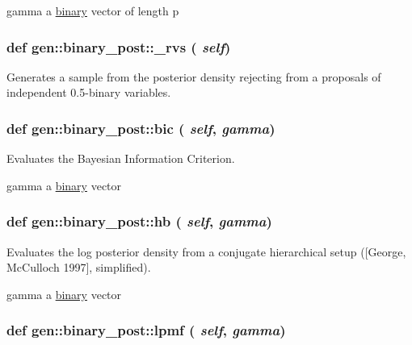 gamma a \hyperlink{classgen_1_1binary}{binary} vector of length p \hypertarget{classgen_1_1binary__post_bc265fbdb0840423716d8a4904469ac8}{
\subsubsection[{\_\-rvs}]{\setlength{\rightskip}{0pt plus 5cm}def gen::binary\_\-post::\_\-rvs ( {\em self})}}
\label{classgen_1_1binary__post_bc265fbdb0840423716d8a4904469ac8}


Generates a sample from the posterior density rejecting from a proposals of independent 0.5-binary variables. 

\hypertarget{classgen_1_1binary__post_f34f5b3a16fe5f6b90b61feac26a759c}{
\subsubsection[{bic}]{\setlength{\rightskip}{0pt plus 5cm}def gen::binary\_\-post::bic ( {\em self}, \/   {\em gamma})}}
\label{classgen_1_1binary__post_f34f5b3a16fe5f6b90b61feac26a759c}


Evaluates the Bayesian Information Criterion. 

gamma a \hyperlink{classgen_1_1binary}{binary} vector \hypertarget{classgen_1_1binary__post_26a109b16742daa55d257a7678e156c3}{
\subsubsection[{hb}]{\setlength{\rightskip}{0pt plus 5cm}def gen::binary\_\-post::hb ( {\em self}, \/   {\em gamma})}}
\label{classgen_1_1binary__post_26a109b16742daa55d257a7678e156c3}


Evaluates the log posterior density from a conjugate hierarchical setup (\mbox{[}George, McCulloch 1997\mbox{]}, simplified). 

gamma a \hyperlink{classgen_1_1binary}{binary} vector \hypertarget{classgen_1_1binary__post_2ad20ce2b2b31381d879c8f83559f771}{
\subsubsection[{lpmf}]{\setlength{\rightskip}{0pt plus 5cm}def gen::binary\_\-post::lpmf ( {\em self}, \/   {\em gamma})}}
\label{classgen_1_1binary__post_2ad20ce2b2b31381d879c8f83559f771}


